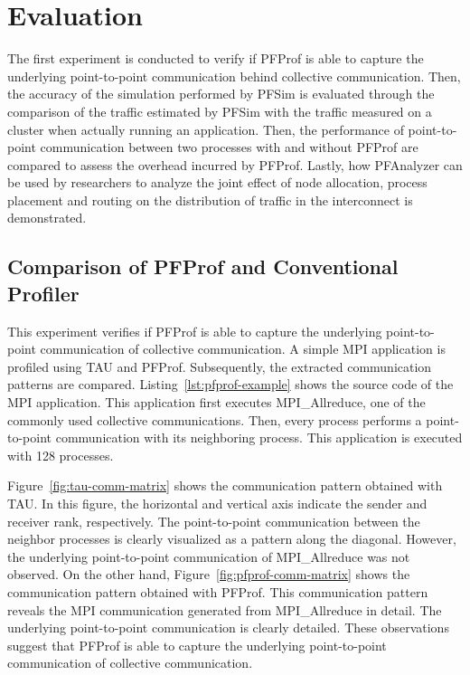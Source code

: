 \section{Evaluation}\label{sec:ii-evaluation}

The first experiment is conducted to verify if PFProf is able to capture
the underlying point-to-point communication behind collective communication.
Then, the accuracy of the simulation performed by PFSim is evaluated through
the comparison of the traffic estimated by PFSim with the traffic measured on
a cluster when actually running an application. Then, the performance of
point-to-point communication between two processes with and without PFProf are
compared to assess the overhead incurred by PFProf. Lastly, how PFAnalyzer can
be used by researchers to analyze the joint effect of node allocation, process
placement and routing on the distribution of traffic in the interconnect is
demonstrated.

\subsection{Comparison of PFProf and Conventional Profiler}%
\label{sec:ii-eval-pfprof}

This experiment verifies if PFProf is able to capture the underlying
point-to-point communication of collective communication. A simple
MPI application is profiled using TAU and PFProf. Subsequently, the extracted
communication patterns are compared. Listing~\ref{lst:pfprof-example} shows
the source code of the MPI application. This application first executes
MPI\_Allreduce, one of the commonly used collective communications. Then,
every process performs a point-to-point communication with its neighboring
process. This application is executed with 128 processes.

Figure~\ref{fig:tau-comm-matrix} shows the communication pattern obtained with
TAU\@. In this figure, the horizontal and vertical axis indicate the sender and
receiver rank, respectively. The point-to-point communication between the
neighbor processes is clearly visualized as a pattern along the diagonal.
However, the underlying point-to-point communication of MPI\_Allreduce was not
observed. On the other hand, Figure~\ref{fig:pfprof-comm-matrix} shows the
communication pattern obtained with PFProf. This communication pattern reveals
the MPI communication generated from MPI\_Allreduce in detail. The underlying
point-to-point communication is clearly detailed. These observations suggest
that PFProf is able to capture the underlying point-to-point communication of
collective communication.

